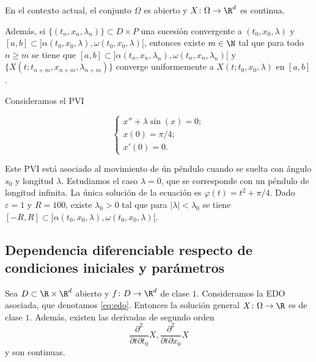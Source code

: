 \begin{theorem}
  \label{thm:cuc-parametros}
  En el contexto actual, el conjunto $\Omega$ es abierto y $X \colon \Omega \to \R^d$ es continua.

  Además, si $\{(t_n, x_n, \lambda_n)\} \subset D \times P$ una sucesión convergente a
  $(t_0, x_0, \lambda)$ y $[a,b] \subset ]\alpha(t_0,x_0,\lambda), \omega(t_0, x_0, \lambda)[$,
  entonces existe $m \in \N$ tal que para todo $n \ge m$ se tiene que
  $[a,b] \subset ]\alpha(t_n,x_n,\lambda_n), \omega(t_n, x_n, \lambda_n)[$ y
  $\{X(t; t_{n+m}, x_{n+m}, \lambda_{n+m})\}$ converge uniformemente a $X(t; t_0, x_0, \lambda)$ en
  $[a,b]$.
\end{theorem}

\begin{ex}
  Consideramos el PVI

  \[
    \begin{cases}
      x'' + \lambda \sin(x) = 0; \\
      x(0) = \pi / 4; \\
      x'(0) = 0.
    \end{cases}
  \]

  Este PVI está asociado al movimiento de ún péndulo cuando se suelta con ángulo $s_0$ y longitud
  $\lambda$. Estudiamos el caso $\lambda = 0$, que se corresponde con un péndulo de longitud
  infinita. La única solución de la ecuación es $\varphi(t) = t^2 + \pi/4$. Dado $\varepsilon = 1$ y
  $R = 100$, existe $\lambda_0 >0$ tal que para $|\lambda| < \lambda_0$ se tiene
  $[-R,R] \subset ]\alpha(t_0,x_0,\lambda), \omega(t_0, x_0, \lambda)[$.
\end{ex}

\subsection{Dependencia diferenciable respecto de condiciones iniciales y parámetros}

\begin{theorem}
  Sea $D \subset \R \times \R^d$ abierto y $f \colon D \to \R^d$ de clase $1$. Consideramos la EDO
  asociada, que denotamos \eqref{eq:edo}. Entonces la solución general $X \colon \Omega \to \R$ es
  de clase $1$. Además, existen las derivadas de segundo orden
  \[\frac{\partial^2}{\partial t \partial t_0} X, \frac{\partial^2}{\partial t \partial x_0} X\]
  y son continuas.
\end{theorem}

